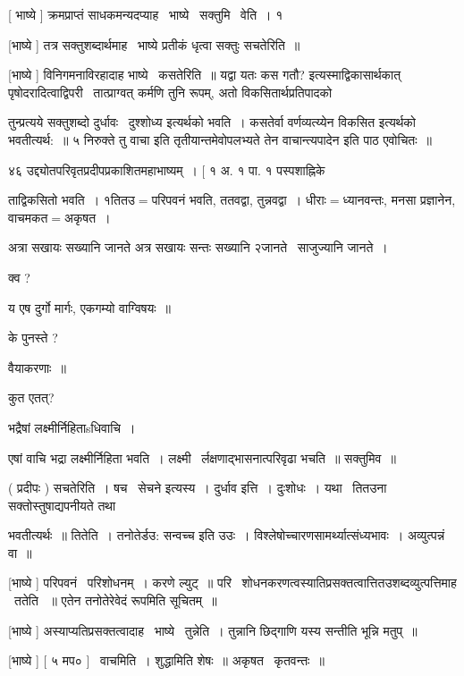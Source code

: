 \documentclass[11pt, openany]{book}
\begin{document}
 [ भाष्ये ] क्रमप्राप्तं साधकमन्यदप्याह \textendash\ भाष्ये \textendash\ सक्तुमि \textendash\ वेति~। १ 

 [भाष्ये ] तत्र सक्तुशब्दार्थमाह \textendash\ भाष्ये प्रतीकं धृत्वा सक्तुः
सचतेरिति~॥ 

 [भाष्ये ] विनिगमनाविरहादाह भाष्ये \textendash\ कसतेरिति~॥ यद्वा यतः कस गतौ?
इत्यस्माद्विकासार्थकात् पृषोदरादित्वाद्विपरी \textendash\ तात्प्राग्वत् कर्मणि तुनि
रूपम्, अतो विकसितार्थप्रतिपादको 



तुन्प्रत्यये सक्तुशब्दो दुर्धावः \textendash\ दुश्शोध्य इत्यर्थको भवति~। कसतेर्वा
वर्णव्यत्य्येन विकसित इत्यर्थको भवतीत्यर्थ:~॥ ५ निरुक्ते तु {\qt वाचा} इति
तृतीयान्तमेवोपलभ्यते तेन {\qt वाचा}न्त्यपादेन इति पाठ एवोचितः~॥ 

४६ उद्द्योतपरिवृतप्रदीपप्रकाशितमहाभाष्यम्~। [ १ अ. १ पा. १
पस्पशाह्निके 



ताद्विकसितो भवति~। १तितउ$=$परिपवनं भवति, ततवद्वा, तुन्नवद्वा~। 
धीराः$=$ध्यानवन्तः, मनसा प्रज्ञानेन, वाचमकत$=$अकृषत~। 

 {\qt अत्रा सखायः सख्यानि जानते} अत्र सखायः सन्तः सख्यानि २जानते \textendash\ साजुज्यानि
जानते~। 

क्व ? 

य एष दुर्गो मार्गः, एकगम्यो वाग्विषयः~॥ 

के पुनस्ते ? 

वैयाकरणाः~॥ 

कुत एतत्? 

भद्रैषां लक्ष्मीर्निहिताsधिवाचि~। 

 एषां वाचि भद्रा लक्ष्मीर्निहिता भवति~। लक्ष्मी \textendash\ 
र्लक्षणाद्भासनात्परिवृढा भचति~॥ सक्तुमिव~॥ 

 ( प्रदीपः ) सचतेरिति~। {\qt षच \textendash\ सेचने} इत्यस्य~। दुर्धाव इत्ति~। 
दुःशोधः~। यथा \textendash\ तितउना सक्तोस्तुषाद्यपनीयते तथा



भवतीत्यर्थः~॥ तितेति~। {\qt तनोतेर्डउ: सन्वच्च} इति उउः~। 
विश्लेषोच्चारणसामर्थ्यात्संध्यभावः~। अव्युत्पन्नं वा~॥ 

 [भाष्ये ] परिपवनं \textendash\ परिशोधनम्~। करणे ल्युट्~॥ परि \textendash\ 
शोधनकरणत्वस्यातिप्रसक्तत्वात्तितउशब्दव्युत्पत्तिमाह \textendash\ ततेति ~॥ एतेन
तनोतेरेवेदं रूपमिति सूचितम्~॥

 [भाष्ये ] अस्याप्यतिप्रसक्तत्वादाह \textendash\ भाष्ये \textendash\ तुन्नेति~। तुन्नानि
छिद्गाणि यस्य सन्तीति भून्नि मतुप्~॥ 

 [भाष्ये ] [ ५ मप० ] \textendash\ वाचमिति~। शुद्धामिति शेषः~॥
अकृषत \textendash\ कृतवन्तः~॥ 
\end{document}
